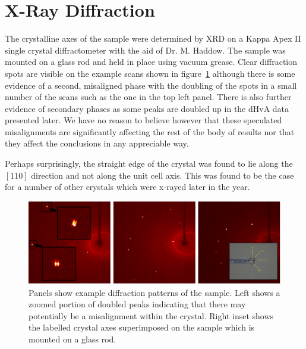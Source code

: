 
\section{X-Ray Diffraction}
    \label{Sec:ResD:XrayDiffraction}

The crystalline axes of the sample were determined by \ac{XRD} on a Kappa Apex II single crystal diffractometer with the aid of Dr. M. Haddow. The sample was mounted on a glass rod and held in place using vacuum grease. Clear diffraction spots are visible on the example scans shown in figure~\ref{Fig:ResD:XRayDiffraction} although there is some evidence of a second, misaligned phase with the doubling of the spots in a small number of the scans such as the one in the top left panel. There is also further evidence of secondary phases as some peaks are doubled up in the dHvA data presented later. We have no reason to believe however that these speculated misalignments are significantly affecting the rest of the body of results nor that they affect the conclusions in any appreciable way.

Perhaps surprisingly, the straight edge of the crystal was found to lie along the $[110]$ direction and not along the unit cell axis. This was found to be the case for a number of other \BaFePAs crystals which were x-rayed later in the year.

\begin{figure}[htbp]
    \begin{center}
        \includegraphics[scale=0.7]{Chapter-dHvABaFe2P2/Figures/Xrays/XRayDiffraction/XRayDiffraction}
        \caption{Panels show example diffraction patterns of the \BaFeP sample. Left shows a zoomed portion of doubled peaks indicating that there may potentially be a misalignment within the crystal. Right inset shows the labelled crystal axes superimposed on the sample which is mounted on a glass rod.}
        \label{Fig:ResD:XRayDiffraction}
    \end{center}
\end{figure}

